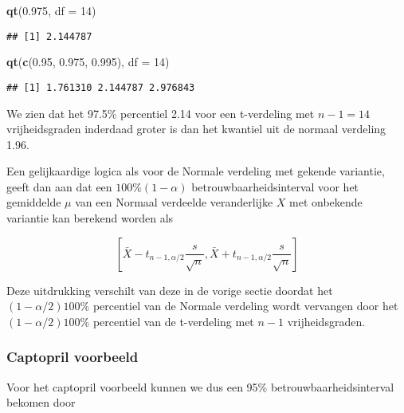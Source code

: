 \documentclass[
  12pt,dutch,coursenotes]{book}
\newenvironment{Shaded}{\begin{snugshade}}{\end{snugshade}}
\newcommand{\DataTypeTok}[1]{\textcolor[rgb]{0.13,0.29,0.53}{#1}}
\newcommand{\DecValTok}[1]{\textcolor[rgb]{0.00,0.00,0.81}{#1}}
\newcommand{\FloatTok}[1]{\textcolor[rgb]{0.00,0.00,0.81}{#1}}
\newcommand{\KeywordTok}[1]{\textcolor[rgb]{0.13,0.29,0.53}{\textbf{#1}}}
\newcommand{\NormalTok}[1]{#1}
\theoremstyle{definition}
\theoremstyle{definition}
\theoremstyle{definition}
\theoremstyle{remark}
\begin{document}
\begin{Shaded}
\begin{Highlighting}[]
\KeywordTok{qt}\NormalTok{(}\FloatTok{0.975}\NormalTok{, }\DataTypeTok{df =} \DecValTok{14}\NormalTok{)}
\end{Highlighting}
\end{Shaded}

\begin{verbatim}
## [1] 2.144787
\end{verbatim}

\begin{Shaded}
\begin{Highlighting}[]
\KeywordTok{qt}\NormalTok{(}\KeywordTok{c}\NormalTok{(}\FloatTok{0.95}\NormalTok{, }\FloatTok{0.975}\NormalTok{, }\FloatTok{0.995}\NormalTok{), }\DataTypeTok{df =} \DecValTok{14}\NormalTok{)}
\end{Highlighting}
\end{Shaded}

\begin{verbatim}
## [1] 1.761310 2.144787 2.976843
\end{verbatim}

We zien dat het 97.5\% percentiel 2.14 voor een t-verdeling met \(n-1=14\) vrijheidsgraden inderdaad groter is dan het kwantiel uit de normaal verdeling 1.96.

Een gelijkaardige logica als voor de Normale verdeling met gekende variantie, geeft dan aan dat een \(100\% (1-\alpha)\) betrouwbaarheidsinterval voor het gemiddelde \(\mu\) van een
Normaal verdeelde veranderlijke \(X\) met onbekende variantie kan berekend
worden als

\begin{equation*}
\left[\bar{X} - t_{n-1, \alpha/2} \frac{s}{\sqrt{n}} , \bar{X} + t_{n-1,
\alpha/2} \frac{s}{\sqrt{n}}\right]
\end{equation*}

Deze uitdrukking verschilt van deze in de vorige sectie doordat het \((1-\alpha/2)100\%\) percentiel van de Normale verdeling wordt vervangen door
het \((1-\alpha/2)100\%\) percentiel van de t-verdeling met \(n-1\)
vrijheidsgraden.

\hypertarget{captopril-voorbeeld-1}{%
\subsubsection{Captopril voorbeeld}\label{captopril-voorbeeld-1}}

Voor het captopril voorbeeld kunnen we dus een 95\% betrouwbaarheidsinterval bekomen door
\end{document}
